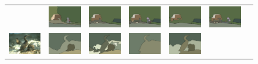 \begin{figure}[tb]
\begin{center}
\begin{tabular}{ c  c  c  c  c  c  c }
&\includegraphics[width=2cm]{fig/visual_result/visual_result_2_3.png}
&\includegraphics[width=2cm]{fig/visual_result/visual_result_2_4.png}
&\includegraphics[width=2cm]{fig/visual_result/visual_result_2_5.png}
&\includegraphics[width=2cm]{fig/visual_result/visual_result_2_6.png}
&\includegraphics[width=2cm]{fig/visual_result/visual_result_2_7.png}
\\
\includegraphics[width=2cm]{fig/visual_result/visual_result_3_1.png}
&\includegraphics[width=2cm]{fig/visual_result/visual_result_3_2.png}
&\includegraphics[width=2cm]{fig/visual_result/visual_result_3_3.png}
&\includegraphics[width=2cm]{fig/visual_result/visual_result_3_4.png}
&\includegraphics[width=2cm]{fig/visual_result/visual_result_3_5.png}

\end{tabular}
\end{center}
\end{figure}
